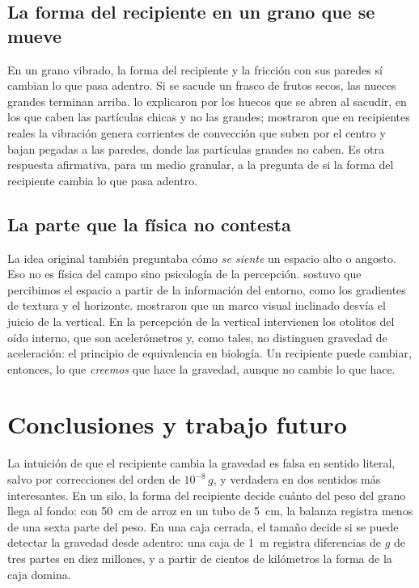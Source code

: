 \documentclass[11pt,a4paper]{article}
\begin{document}
\subsection{La forma del recipiente en un grano que se mueve}

En un grano vibrado, la forma del recipiente y la fricción con sus paredes sí cambian lo que pasa adentro. Si se sacude un frasco de frutos secos, las nueces grandes terminan arriba. \textcite{rosato1987} lo explicaron por los huecos que se abren al sacudir, en los que caben las partículas chicas y no las grandes; \textcite{knight1993} mostraron que en recipientes reales la vibración genera corrientes de convección que suben por el centro y bajan pegadas a las paredes, donde las partículas grandes no caben. Es otra respuesta afirmativa, para un medio granular, a la pregunta de si la forma del recipiente cambia lo que pasa adentro.

\subsection{La parte que la física no contesta}

La idea original también preguntaba cómo \emph{se siente} un espacio alto o angosto. Eso no es física del campo sino psicología de la percepción. \textcite{gibson1979} sostuvo que percibimos el espacio a partir de la información del entorno, como los gradientes de textura y el horizonte. \textcite{witkin1948} mostraron que un marco visual inclinado desvía el juicio de la vertical. En la percepción de la vertical intervienen los otolitos del oído interno, que son acelerómetros y, como tales, no distinguen gravedad de aceleración: el principio de equivalencia en biología. Un recipiente puede cambiar, entonces, lo que \emph{creemos} que hace la gravedad, aunque no cambie lo que hace.

\section{Conclusiones y trabajo futuro}\label{sec:conclusiones}

La intuición de que el recipiente cambia la gravedad es falsa en sentido literal, salvo por correcciones del orden de $10^{-8}\,g$, y verdadera en dos sentidos más interesantes. En un silo, la forma del recipiente decide cuánto del peso del grano llega al fondo: con 50~cm de arroz en un tubo de 5~cm, la balanza registra menos de una sexta parte del peso. En una caja cerrada, el tamaño decide si se puede detectar la gravedad desde adentro: una caja de 1~m registra diferencias de $g$ de tres partes en diez millones, y a partir de cientos de kilómetros la forma de la caja domina.
\end{document}
